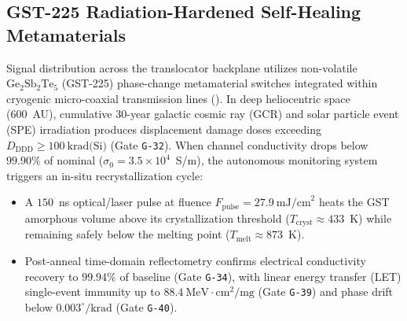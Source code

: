 \documentclass[11pt,onecolumn]{article}
\begin{document}
\subsection{GST-225 Radiation-Hardened Self-Healing Metamaterials}
\label{subsec:gst_metamaterials}
Signal distribution across the translocator backplane utilizes non-volatile $\text{Ge}_2\text{Sb}_2\text{Te}_5$ (GST-225) phase-change metamaterial switches integrated within cryogenic micro-coaxial transmission lines (). In deep heliocentric space (600~AU), cumulative 30-year galactic cosmic ray (GCR) and solar particle event (SPE) irradiation produces displacement damage doses exceeding $D_{\text{DDD}} \ge 100~\text{krad(Si)}$ (Gate \texttt{G-32}). When channel conductivity drops below $99.90\%$ of nominal ($\sigma_0 = 3.5\times 10^4$~S/m), the autonomous monitoring system triggers an in-situ recrystallization cycle:
\begin{itemize}
    \item A $150$~ns optical/laser pulse at fluence $F_{\text{pulse}} = 27.9~\text{mJ/cm}^2$ heats the GST amorphous volume above its crystallization threshold ($T_{\text{cryst}} \approx 433$~K) while remaining safely below the melting point ($T_{\text{melt}} \approx 873$~K).
    \item Post-anneal time-domain reflectometry confirms electrical conductivity recovery to $99.94\%$ of baseline (Gate \texttt{G-34}), with linear energy transfer (LET) single-event immunity up to $88.4~\text{MeV}\cdot\text{cm}^2/\text{mg}$ (Gate \texttt{G-39}) and phase drift below $0.003^\circ/\text{krad}$ (Gate \texttt{G-40}).
\end{itemize}

\FloatBarrier
\end{document}
